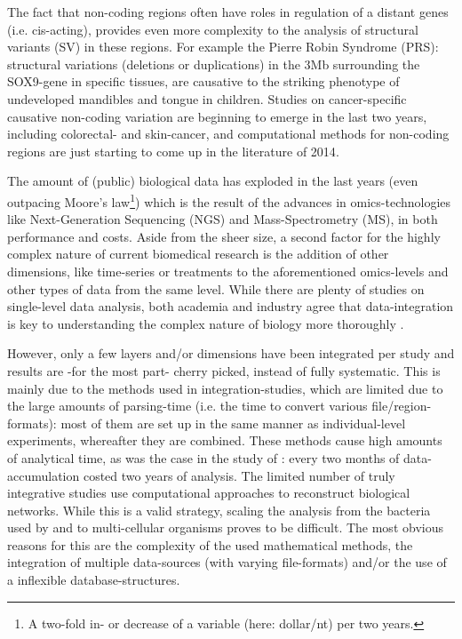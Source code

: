\documentclass[twoside,fontsize=10pt]{article}
\begin{document}
The fact that non-coding regions often have roles in regulation of a distant genes (i.e. cis-acting), provides even more complexity to the analysis of structural variants (SV) in these regions. For example the Pierre Robin Syndrome (PRS): structural variations (deletions or duplications) in the 3Mb surrounding the SOX9-gene in specific tissues, are causative to the striking phenotype of undeveloped mandibles and tongue in children\cite{Benko2009,Kurth2009}. Studies on cancer-specific causative non-coding variation are beginning to emerge in the last two years, including colorectal- and skin-cancer\cite{Ongen2014,Huang2013}, and computational methods for non-coding regions are just starting to come up in the literature of 2014\cite{Khurana2013,Kircher2014}.  
\medskip

\noindent
The amount of (public) biological data has exploded in the last years (even outpacing Moore's law\footnote{A two-fold in- or decrease of a variable (here: dollar/nt) per two years.}) which is the result of the advances in omics-technologies like Next-Generation Sequencing (NGS) and Mass-Spectrometry (MS), in both performance and costs. Aside from the sheer size, a second factor for the highly complex nature of current biomedical research is the addition of other dimensions, like time-series or treatments to the aforementioned omics-levels and other types of data from the same level. While there are plenty of studies on single-level data analysis, both academia and industry agree that data-integration is key to understanding the complex nature of biology more thoroughly \citep{Gomez-Cabrero2014, Huttenhower2010, Searls2005, Hamid2009}. 

However, only a few layers and/or dimensions have been integrated per study and results are -for the most part- cherry picked, instead of fully systematic. This is mainly due to the methods used in integration-studies, which are limited due to the large amounts of parsing-time (i.e. the time to convert various file/region-formats): most of them are set up in the same manner as individual-level experiments, whereafter they are combined. These methods cause high amounts of analytical time, as was the case in the study of \citet{Munoz2011}: every two months of data-accumulation costed two years of analysis. The limited number of truly integrative studies use computational approaches to reconstruct biological networks. While this is a valid strategy, scaling the analysis from the bacteria used by \citet{Karr2012} and \citet{Lerman2012} to multi-cellular organisms proves to be difficult. The most obvious reasons for this are the complexity of the used mathematical methods, the integration of multiple data-sources (with varying file-formats) and/or the use of a inflexible database-structures. 
\medskip
\end{document}
